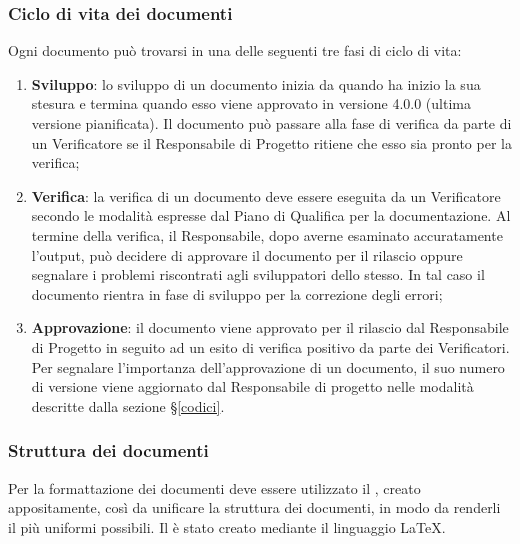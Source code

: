		\subsubsection{Ciclo di vita dei documenti}

			Ogni documento può trovarsi in una delle seguenti tre fasi di ciclo di vita:

                \begin{enumerate}
                    \item \textbf{Sviluppo}: lo sviluppo di un documento inizia da quando ha inizio la
                    sua stesura e termina quando esso viene approvato in versione 4.0.0 (ultima versione pianificata). 
                    Il documento può passare alla fase
                    di verifica da parte di un Verificatore se il Responsabile di Progetto ritiene che
                    esso sia pronto per la verifica;
                    \item \textbf{Verifica}: la verifica di un documento deve essere eseguita da un
                    Verificatore secondo le modalità espresse dal Piano di Qualifica per la documentazione.
                    Al termine della verifica, il Responsabile, dopo averne esaminato accuratamente
                    l'output, può decidere di approvare il documento per il rilascio oppure segnalare i problemi
                    riscontrati agli sviluppatori dello stesso. In tal caso il documento rientra in fase
                    di sviluppo per la correzione degli errori;
                    \item \textbf{Approvazione}: il documento viene approvato per il rilascio dal Responsabile di Progetto
                    in seguito ad un esito di verifica positivo da parte dei Verificatori.
                    Per segnalare l'importanza dell'approvazione di un documento, il suo numero di versione
                    viene aggiornato dal Responsabile di progetto nelle modalità descritte dalla sezione §\ref{codici}.
                \end{enumerate}

\newpage

		\subsubsection{Struttura dei documenti}


				Per la formattazione dei documenti deve essere utilizzato il ,
				creato appositamente, così da unificare la struttura dei documenti, in modo da renderli 
				il più uniformi possibili. 
				Il  è stato creato mediante il linguaggio \LaTeX{}.

